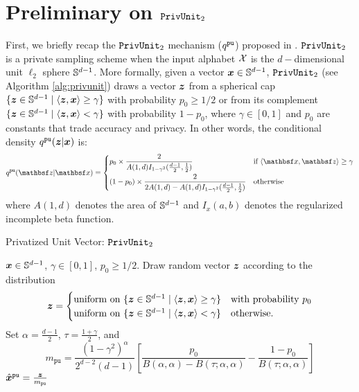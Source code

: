 \section{Preliminary on \texorpdfstring{$\texttt{PrivUnit}_2$}{PrivUnit}}
\label{appendix:privunit}

First, we briefly recap the $\texttt{PrivUnit}_2$ mechanism ($q^{\texttt{pu}}$) proposed in \cite{BDFKR2018}. $\texttt{PrivUnit}_2$ is a private sampling scheme when the input alphabet $\mathcal{X}$ is the $d-$dimensional unit $\ell_2$ sphere $\mathbb{S}^{d-1}$. More formally, given a vector ${\boldsymbol{x}} \in \mathbb{S}^{d-1}$, $\texttt{PrivUnit}_2$ (see Algorithm \ref{alg:privunit}) draws a vector ${\boldsymbol{z}}$ from a spherical cap $\{{\boldsymbol{z}} \in \mathbb{S}^{d-1} \mid
\langle {\boldsymbol{z}}, {\boldsymbol{x}}  \rangle \ge \gamma\}$ with probability $p_0 \geq 1/2$ or from its complement $\{{\boldsymbol{z}} \in \mathbb{S}^{d-1} \mid \langle {\boldsymbol{z}}, {\boldsymbol{x}} \rangle < \gamma\}$  with probability $1 - p_0$, where
$\gamma \in [0, 1]$ and $p_0$ are constants that trade accuracy and privacy. In other words, the conditional density $q^{\texttt{pu}}({\boldsymbol{z}} | {\boldsymbol{x}})$ is:
\begin{align}\label{eq:qpu}
    \qPU(\rvbz | \rvbx) = 
    \begin{cases}
      p_0 \times \dfrac{2}{A(1,d)I_{1-\gamma^2}(\frac{d-1}{2},\frac{1}{2})} & \text{if}\ \langle \rvbx, \rvbz \rangle \geq \gamma
      \\[10pt]
      (1-p_0) \times \dfrac{2}{2A(1,d)- A(1,d)I_{1-\gamma^2}(\frac{d-1}{2},\frac{1}{2})} & \text{otherwise}
    \end{cases}
\end{align}
where $A(1,d)$ denotes the area of $\mathbb{S}^{d-1}$ and $I_x(a,b)$ denotes the regularized incomplete beta function.


\begin{algorithm}[h]
\caption{Privatized Unit Vector: $\texttt{PrivUnit}_2$}
\label{alg:privunit}
\begin{algorithmic}
\Require ${\boldsymbol{x}} \in \mathbb{S}^{d-1}$, $\gamma \in [0,1]$, $p_0 \ge 1/2$.
\State Draw random vector ${\boldsymbol{z}}$ according to the distribution
\State \begin{equation}
	  \label{eqn:w-flip-mechanism}
	  {\boldsymbol{z}} = \begin{cases}
	    \mbox{uniform on } \{{\boldsymbol{z}} \in \mathbb{S}^{d-1} \mid
	    \langle {\boldsymbol{z}}, {\boldsymbol{x}} 
	    \rangle \ge \gamma\} & \mbox{with~probability~} p_0 \\
	    \mbox{uniform on } \{{\boldsymbol{z}} \in \mathbb{S}^{d-1} \mid
	    \langle {\boldsymbol{z}}, {\boldsymbol{x}} 
	    \rangle < \gamma \} & \mbox{otherwise}.
	  \end{cases}
\end{equation}
\State Set $\alpha = \frac{d-1}{2}$, $\tau = \frac{1+\gamma}{2}$, and
\begin{equation}
  m_{\texttt{pu}} = \frac{(1 - \gamma^2)^\alpha}{2^{d-2} (d - 1)}
  \left[\frac{p_0}{B(\alpha,\alpha) - B(\tau; \alpha,\alpha)}
    - \frac{1 - p_0}{B(\tau; \alpha, \alpha)}\right]
  \label{eqn:norm-of-W}
\end{equation}
\Return $\hat{{\boldsymbol{x}}}^{\texttt{pu}} = \frac{{\boldsymbol{z}}}{m_{\texttt{pu}}}$
\end{algorithmic}
\end{algorithm}


